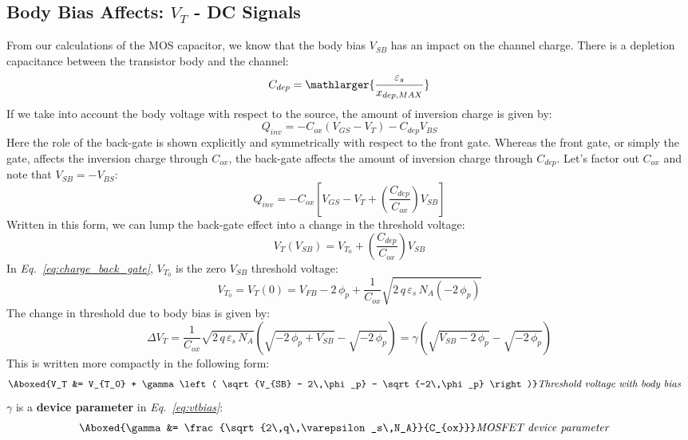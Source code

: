 \subsection{Body Bias Affects: \texorpdfstring{$V_T$}{Threshold Voltage} - DC Signals}
From our calculations of the MOS capacitor, we know that the body bias $V_{SB}$ has an impact on the channel charge.  There is a depletion capacitance between the transistor body and the channel:
    \begin{equation}
        C_{dep} = \mathlarger{\frac{\varepsilon_s}{x_{dep,MAX}}}
    \end{equation}
If we take into account the body voltage with respect to the source, the amount of inversion charge is given by:
    \begin{equation}
        Q_{inv} =  -C_{ox}(V_{GS} - V_T) - C_{dep}V_{BS}
    \end{equation}
Here the role of the back-gate is shown explicitly and symmetrically with respect to the front gate.  Whereas the front gate, or simply the gate, affects the inversion charge through $C_{ox}$, the back-gate affects the amount of inversion charge through $C_{dep}$.  Let's factor out $C_{ox}$ and note that $V_{SB} = - V_{BS}$:
    \begin{equation}
        Q_{inv} =  -C_{ox}\left[ {V_{GS} - V_T + \left( \frac{C_{dep}}{C_{ox}} \right)V_{SB}} \right]
    \end{equation}
Written in this form, we can lump the back-gate effect into a change in the threshold voltage:
    \begin{equation}
        V_T(V_{SB}) = V_{T_0} + \left( \frac{C_{dep}}{C_{ox}} \right)V_{SB}
        \label{eq:charge_back_gate}
    \end{equation}
In \emph{Eq.~\ref{eq:charge_back_gate}}, $V_{T_0}$ is the zero $V_{SB}$ threshold voltage:
    \begin{equation}
        V_{T_0} = V_T(0) = V_{FB} - 2\,\phi_p + \frac{1}{C_{ox}} \sqrt{2\,q\,\varepsilon_s\,N_A(-2\,\phi_p)}
    \end{equation}
The change in threshold due to body bias is given by:
    \begin{equation}
        \Delta V_T = \frac{1}{C_{ox}} \sqrt{2\,q\,\varepsilon_s\,N_A} \left(\sqrt{-2\,\phi_p + V_{SB}} - \sqrt{-2\,\phi_p} \right)
        = \gamma \left( {\sqrt{V_{SB} - 2\,\phi_p} - \sqrt{-2\,\phi_p}} \right)
    \end{equation}
This is written more compactly in the following form:
    \begin{align}
        \Aboxed{V_T &= V_{T_0} + \gamma \left( \sqrt{V_{SB} - 2\,\phi_p} - \sqrt{-2\,\phi_p} \right)} &\textit{Threshold voltage with body bias}
        \label{eq:vtbias}
    \end{align}
$\gamma$ is a \textbf{device parameter} in \emph{Eq.~\ref{eq:vtbias}}:
    \begin{align}
        \Aboxed{\gamma &= \frac{\sqrt{2\,q\,\varepsilon_s\,N_A}}{C_{ox}}} &\textit{MOSFET device parameter}
    \end{align}
